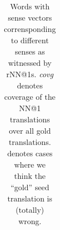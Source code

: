 \documentclass[11pt]{article}
\begin{document}
\begin{table}
{\begin{tabular}{llll}
    \bottomrule
  \end{tabular} 
  }
  \caption{Words with sense vectors corrensponding to different senses as
  witnessed by rNN@1s.  \emph{covg} denotes coverage of the NN@1 translations
  over all gold translations.  \bad denotes cases where we think the ``gold''
  seed translation is (totally) wrong.  
  }
  \label{tab:alkoto}
\end{table}
\end{document}
